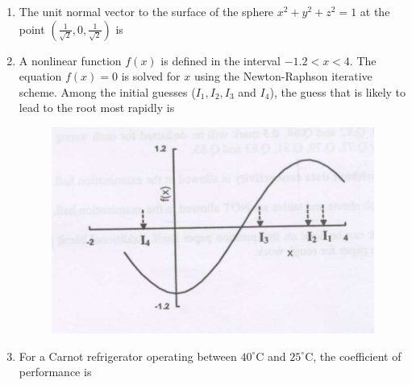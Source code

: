 \documentclass[journal,12pt,onecolumn]{IEEEtran}
\theoremstyle{remark}
\begin{document}
\begin{enumerate}
\item The unit normal vector to the surface of the sphere $x^2 + y^2 + z^2 = 1$ at the point $\left(\frac{1}{\sqrt{2}}, 0, \frac{1}{\sqrt{2}}\right)$ is
\hfill{}
\begin{enumerate}
\end{enumerate}

\item A nonlinear function $f(x)$ is defined in the interval $-1.2 < x < 4$. The equation $f(x) = 0$ is solved for $x$ using the Newton-Raphson iterative scheme. Among the initial guesses ($I_1, I_2, I_3$ and $I_4$), the guess that is likely to lead to the root most rapidly is
\begin{figure}[H]
\centering
\includegraphics[width=0.25\columnwidth]{figs/qn5.jpg}
\caption{}
\label{fig:qn5.jpg}
\end{figure}
\hfill{}
\begin{enumerate}
    \end{enumerate}

\item For a Carnot refrigerator operating between $40^\circ\text{C}$ and $25^\circ\text{C}$, the coefficient of performance is
\hfill{}
    \begin{enumerate}[label=(\Alph*)]
    \end{enumerate}


\end{enumerate}
\end{document}
